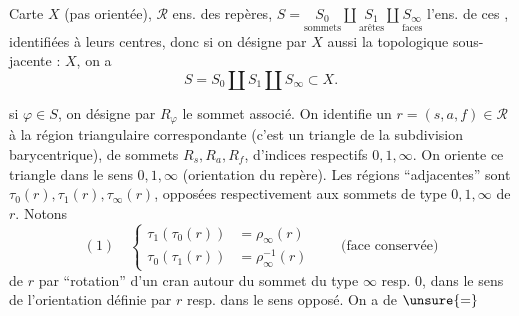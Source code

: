 

Carte $X$ (pas orientée), $\mathcal R$ ens. des repères,
$S=\underset{\text{sommets}}{S_0}\amalg\underset{\text{arêtes}}{S_1}\amalg\underset{\text{faces}}{S_\infty}$
l'ens. de ces , identifiées à  leurs centres, donc si on désigne par $X$ aussi la  topologique sous-jacente : $X$, on a
\[
 S=S_0\amalg S_1\amalg S_\infty\subset X.
\]

si $\varphi\in S$, on désigne par $R_\varphi$ le sommet associé. On identifie un $r=(s,a,f)\in\mathcal R$ à la région triangulaire correspondante (c'est un triangle de la subdivision barycentrique), de sommets $R_s,R_a,R_f$, d'indices respectifs $0,1,\infty$. On oriente ce triangle dans le sens $0,1,\infty$ (orientation du repère). Les régions ``adjacentes'' sont $\tau_0(r),\tau_1(r),\tau_\infty(r)$, opposées respectivement aux sommets de type $0,1,\infty$ de $r$. Notons
\[
 (1)\quad
 \left\{\begin{aligned}
 \tau_1(\tau_0(r))&=\rho_\infty(r)\\
 \tau_0(\tau_1(r))&=\rho_\infty^{-1}(r)
 \end{aligned}\right.
 \qquad\text{(face conservée)}
\]
 de $r$ par ``rotation'' d'un cran autour du sommet du type $\infty$ resp. $0$, dans le sens  de l'orientation définie par $r$ resp. dans le sens opposé. On a de $\unsure{=}$

